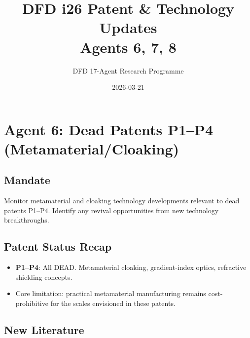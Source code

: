 \documentclass[11pt,a4paper]{article}
\title{DFD i26 Patent \& Technology Updates\\Agents 6, 7, 8}
\author{DFD 17-Agent Research Programme}
\date{2026-03-21}
\begin{document}
\maketitle
\tableofcontents
\newpage

\section{Agent 6: Dead Patents P1--P4 (Metamaterial/Cloaking)}

\subsection{Mandate}
Monitor metamaterial and cloaking technology developments relevant to dead patents P1--P4. Identify any revival opportunities from new technology breakthroughs.

\subsection{Patent Status Recap}
\begin{itemize}
\item \textbf{P1--P4}: All DEAD. Metamaterial cloaking, gradient-index optics, refractive shielding concepts.
\item Core limitation: practical metamaterial manufacturing remains cost-prohibitive for the scales envisioned in these patents.
\end{itemize}

\subsection{New Literature}
\end{document}
